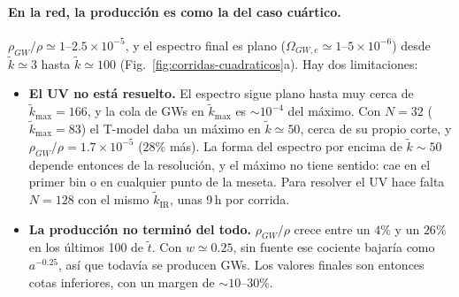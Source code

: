 \documentclass[11pt]{article}
\begin{document}
            \paragraph{En la red, la producción es como la del caso cuártico.} $\rho_{GW}/\rho \simeq 1$--$2.5 \times 10^{-5}$, y el espectro final es plano ($\Omega_{GW,e} \simeq 1$--$5 \times 10^{-6}$) desde $\tilde k \simeq 3$ hasta $\tilde k \simeq 100$ (Fig.~\ref{fig:corridas-cuadraticos}a). Hay dos limitaciones:
            \begin{itemize}
                \item \textbf{El UV no está resuelto.} El espectro sigue plano hasta muy cerca de $\tilde k_{\max} = 166$, y la cola de GWs en $\tilde k_{\max}$ es $\sim 10^{-4}$ del máximo. Con $N = 32$ ($\tilde k_{\max} = 83$) el T-model daba un máximo en $\tilde k \simeq 50$, cerca de su propio corte, y $\rho_{GW}/\rho = 1.7 \times 10^{-5}$ ($28\%$ más). La forma del espectro por encima de $\tilde k \sim 50$ depende entonces de la resolución, y el máximo no tiene sentido: cae en el primer bin o en cualquier punto de la meseta. Para resolver el UV hace falta $N = 128$ con el mismo $\tilde k_{\text{IR}}$, unas 9\,h por corrida.
                \item \textbf{La producción no terminó del todo.} $\rho_{GW}/\rho$ crece entre un $4\%$ y un $26\%$ en los últimos 100 de $\tilde t$. Con $w \simeq 0.25$, sin fuente ese cociente bajaría como $a^{-0.25}$, así que todavía se producen GWs. Los valores finales son entonces cotas inferiores, con un margen de $\sim 10$--$30\%$.
            \end{itemize}
\end{document}

